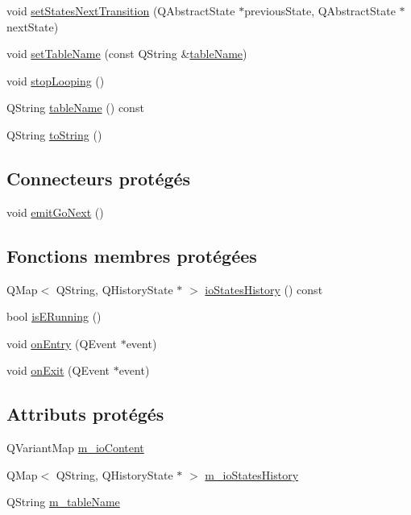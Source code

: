 \begin{DoxyCompactItemize}
\item 
void \hyperlink{classSH__LoopingInOutStateMachine_a0ee122553641721012f3710e71cce234}{set\-States\-Next\-Transition} (Q\-Abstract\-State $\ast$previous\-State, Q\-Abstract\-State $\ast$next\-State)
\item 
void \hyperlink{classSH__InOutStateMachine_a95db31a7e7f31f36a8737adc739ab08c}{set\-Table\-Name} (const Q\-String \&\hyperlink{classSH__InOutStateMachine_a4288a6c86ddf83effefff886675591c9}{table\-Name})
\item 
void \hyperlink{classSH__LoopingInOutStateMachine_a73d75e30318da22fec99387e9bf02a9b}{stop\-Looping} ()
\item 
Q\-String \hyperlink{classSH__InOutStateMachine_a4288a6c86ddf83effefff886675591c9}{table\-Name} () const 
\item 
Q\-String \hyperlink{classSH__GenericStateMachine_a85c0c1c9d258ae991f84667412fa47cd}{to\-String} ()
\end{DoxyCompactItemize}
\subsection*{Connecteurs protégés}
\begin{DoxyCompactItemize}
\item 
void \hyperlink{classSH__GenericStateMachine_a2e162a1da1f694d433cb9072b37ac530}{emit\-Go\-Next} ()
\end{DoxyCompactItemize}
\subsection*{Fonctions membres protégées}
\begin{DoxyCompactItemize}
\item 
Q\-Map$<$ Q\-String, Q\-History\-State $\ast$ $>$ \hyperlink{classSH__InOutStateMachine_a13889998c6dcd17db984dd6ed1454e80}{io\-States\-History} () const 
\item 
bool \hyperlink{classSH__InOutStateMachine_ae6c7448fbe267b035017108a9ffdff2e}{is\-E\-Running} ()
\item 
void \hyperlink{classSH__GenericStateMachine_adfd82f2532595ed7c4bcf21f03cbb951}{on\-Entry} (Q\-Event $\ast$event)
\item 
void \hyperlink{classSH__GenericStateMachine_a4b36d60fa1876908493d3d07f191a30f}{on\-Exit} (Q\-Event $\ast$event)
\end{DoxyCompactItemize}
\subsection*{Attributs protégés}
\begin{DoxyCompactItemize}
\item 
Q\-Variant\-Map \hyperlink{classSH__InOutStateMachine_a8cfbc27eef057bf37b7711bdfef2077e}{m\-\_\-io\-Content}
\item 
Q\-Map$<$ Q\-String, Q\-History\-State $\ast$ $>$ \hyperlink{classSH__InOutStateMachine_ac46ad1af230e1b2156d805275690dec3}{m\-\_\-io\-States\-History}
\item 
Q\-String \hyperlink{classSH__InOutStateMachine_aa009eecc5ab6181358faafb5996b6006}{m\-\_\-table\-Name}
\end{DoxyCompactItemize}
